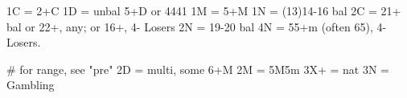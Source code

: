 1C = 2+C
1D = unbal 5+D or 4441
1M = 5+M
1N = (13)14-16 bal
2C = 21+ bal or 22+, any; or 16+, 4- Losers
2N = 19-20 bal
4N = 55+m (often 65), 4- Losers.

# for range, see "pre"
2D = multi, some 6+M
2M = 5M5m
3X+ = nat
3N = Gambling